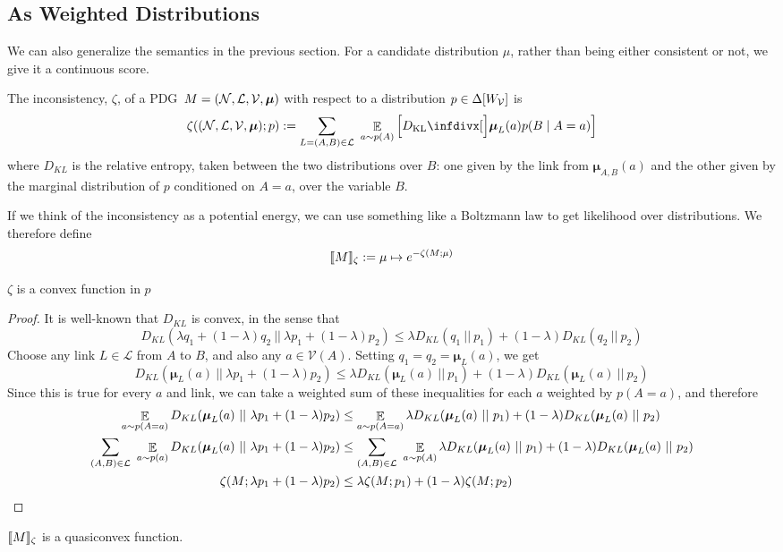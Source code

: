 \documentclass{article}
\newcommand\changeon{\color{note-fg} }
\newcommand{\MN}{PDG}%
\newcommand\bmu{\boldsymbol{\mu}}
\begin{document}
	\subsection{As Weighted Distributions}
	\changeon
	We can also generalize the semantics in the previous section. For a candidate distribution $\mu$, rather than being either consistent or not, we give it a continuous score.

	\begin{defn}
		The inconsistency, $\zeta$, of a \MN\ $M = (\cal N, L, V, \bmu)$ with respect to a distribution $p \in \Delta[W_{\cal V}]$ is
		\[
			\zeta(({\cal N, L, V}, \bmu) ; p) := %
			\sum_{L=(A, B) \in \cal L}~\mathop{\mathbb E}_{a \sim p(A)} \left[\kldiv[\Big]{\bmu_{L}(a) }{ p(B \mid A = a) } \right]
		\]
		where $D_{KL}$ is the relative entropy, taken between the two distributions over $B$: one given by the link from $\bmu_{A,B}(a)$ and the other given by the marginal distribution of $p$ conditioned on $A = a$, over the variable $B$.
	\end{defn}	
	
	
	
	\begin{defn}
		If we think of the inconsistency as a potential energy, we can use something like a Boltzmann law to get likelihood over distributions. We therefore define
		\[\llbracket M\rrbracket_\zeta := \mu \mapsto e^{-\zeta(M;\mu)}\]
	\end{defn}

	\begin{prop}
		$\zeta$ is a convex function in $p$
	\end{prop}
	\begin{proof}
		It is well-known that $D_{KL}$ is convex, in the sense that 
		\[ D_{KL}(\lambda q_1 + (1-\lambda) q_2 \ ||\ \lambda p_1 + (1-\lambda) p_2) \leq \lambda D_{KL} (q_1\ ||\ p_1) + (1-\lambda) D_{KL}(q_2\ ||\ p_2) \]
		Choose any link $L \in \mathcal L$ from $A$ to $B$, and also any $a \in \mathcal V(A)$. 
		Setting $q_1 = q_2 = \bmu_L(a)$, we get
		\[ D_{KL}(\bmu_L(a) \ ||\ \lambda p_1 + (1-\lambda) p_2) \leq \lambda D_{KL} (\bmu_L(a) \ ||\ p_1) + (1-\lambda) D_{KL}(\bmu_L(a)\ ||\ p_2) \]
		Since this is true for every $a$ and link, we can take a weighted sum of these inequalities for each $a$ weighted by $p(A=a)$, and therefore
		\begin{align*}
		 	\E_{a\sim p(A=a)} D_{KL}(\bmu_L(a) \ ||\ \lambda p_1 + (1-\lambda) p_2) &\leq \E_{a\sim p(A=a)}\lambda D_{KL} (\bmu_L(a) \ ||\ p_1) + (1-\lambda) D_{KL}(\bmu_L(a)\ ||\ p_2) \\
		 	\sum_{(A, B) \in \cal L}~\E_{a\sim p(a)} D_{KL}(\bmu_L(a) \ ||\ \lambda p_1 + (1-\lambda) p_2) &\leq \sum_{(A, B) \in \cal L}~\E_{a\sim p(A)}\lambda D_{KL} (\bmu_L(a) \ ||\ p_1) + (1-\lambda) D_{KL}(\bmu_L(a)\ ||\ p_2) \\
		 	\zeta(M ; \lambda p_1 + (1-\lambda)p_2) &\leq \lambda \zeta(M;p_1) + (1-\lambda) \zeta(M;p_2)
		\end{align*}
	\end{proof}
	\begin{conj}
		$\llbracket M\rrbracket_\zeta$ is a quasiconvex function.
	\end{conj}
\end{document}
